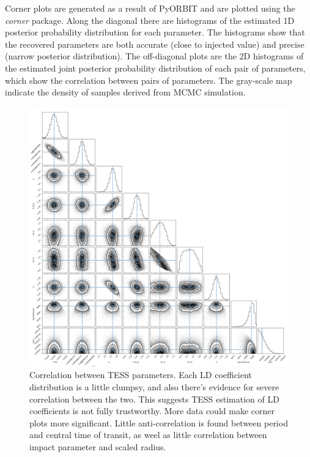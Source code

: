 \documentclass{aa}
\begin{document}
Corner plots are generated as a result of PyORBIT and are plotted using the \textit{corner} package. Along the diagonal there are histograms of the estimated 1D posterior 
probability distribution for each parameter. 
The histograms show that the recovered parameters are both accurate 
(close to injected value) and precise (narrow posterior distribution). 
The off-diagonal plots are the 2D histograms of the estimated joint 
posterior probability distribution of each pair of parameters, which show the correlation between pairs of parameters. The gray-scale map indicate the density of samples derived from MCMC simulation.

\begin{figure}[H]
    \centering
      \includegraphics[scale=0.18, angle=0]{pictures/corner_tess.png}
       \caption{Correlation between TESS parameters. Each LD coefficient distribution is a little clumpsy, and also there's evidence for severe correlation between the two. This suggests TESS estimation of LD coefficients is not fully trustworthy.  More data could make corner plots more significant. Little anti-correlation is found between period and central time of transit, as weel as little correlation between impact parameter and scaled radius. }
\end{figure}
\end{document}
